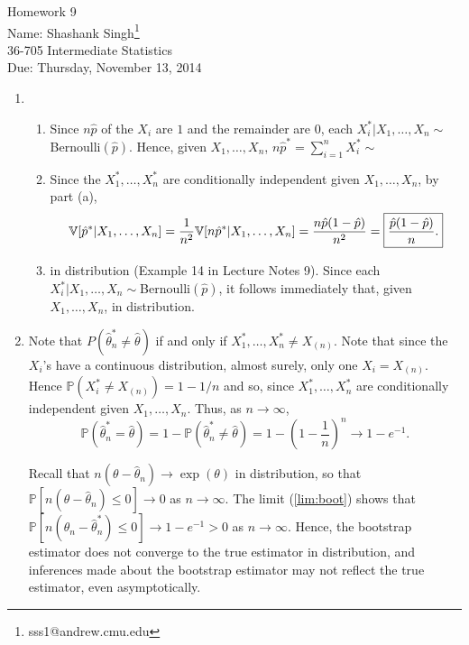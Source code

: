 \documentclass[11pt]{article}
\makeatletter
\newcommand{\myname}{Shashank Singh\footnote{sss1@andrew.cmu.edu}}
\newcommand{\myclass}{36-705 Intermediate Statistics}
\newcommand{\myhwnum}{9}
\newcommand{\duedate}{Thursday, November 13, 2014}
\newcommand{\inv}{^{-1}}
\newcommand{\pr}{\mathbb{P}} %
\newcommand{\Var}{\mathbb{V}} %
\makeatother
\begin{document}
\thispagestyle{plain}

{\Large Homework \myhwnum} \\
Name: \myname \\
\myclass \\
Due: \duedate

\begin{enumerate}
\item
\begin{enumerate}
\item Since $n\hat p$ of the $X_i$ are $1$ and the remainder are $0$, each
$X_i^*|X_1,\dots,X_n\sim$Bernoulli$(\hat p)$. Hence, given $X_1,\dots,X_n$,
$n\hat p^* = \sum_{i = 1}^n X_i^* \sim$
\item Since the $X_1^*,\dots,X_n^*$ are conditionally independent given
$X_1,\dots,X_n$, by part (a),
\[\Var[\hat p^* | X_1,\dots,X_n]
    = \frac{1}{n^2}\Var[n\hat p^* | X_1,\dots,X_n]
    = \frac{n\hat p(1 - \hat p)}{n^2}
    = \mbox{\fbox{$\displaystyle \frac{\hat p(1 - \hat p)}{n}$.}}
\]
\item {} in
distribution (Example 14 in Lecture Notes 9). Since each
$X_i^*|X_1,\dots,X_n\sim$Bernoulli$(\hat p)$, it follows immediately that,
given $X_1,\dots,X_n$,\newline
{} in
distribution.
\end{enumerate}
\item Note that $P(\hat\theta_n^* \neq \hat \theta)$ if and only if
$X_1^*,\dots,X_n^* \neq X_{(n)}$. Note that since the $X_i$'s have a continuous
distribution, almost surely, only one $X_i = X_{(n)}$. Hence
$\pr(X_i^* \neq X_{(n)}) = 1 - 1/n$ and so, since $X_1^*,\dots,X_n^*$ are
conditionally independent given $X_1,\dots,X_n$. Thus, as $n \to \infty$,
\begin{equation}
\pr\left( \hat\theta_n^* = \hat \theta \right)
    = 1 - \pr\left( \hat\theta_n^* \neq \hat \theta \right)
    = 1 - \left( 1 - \frac1n \right)^n
    \to 1 - e\inv.
\label{lim:boot}
\end{equation}

Recall that $n(\theta - \hat\theta_n) \to \exp(\theta)$ in distribution, so
that $\pr[n(\theta - \hat \theta_n) \leq 0] \to 0$ as $n \to \infty$. The limit
(\ref{lim:boot}) shows that
$\pr[n(\hat\theta_n - \hat\theta_n^*) \leq 0] \to 1 - e\inv > 0$ as
$n \to \infty$. Hence, the bootstrap estimator does not converge to the true
estimator in distribution, and inferences made about the bootstrap estimator
may not reflect the true estimator, even asymptotically.


\end{enumerate}
\end{document}
